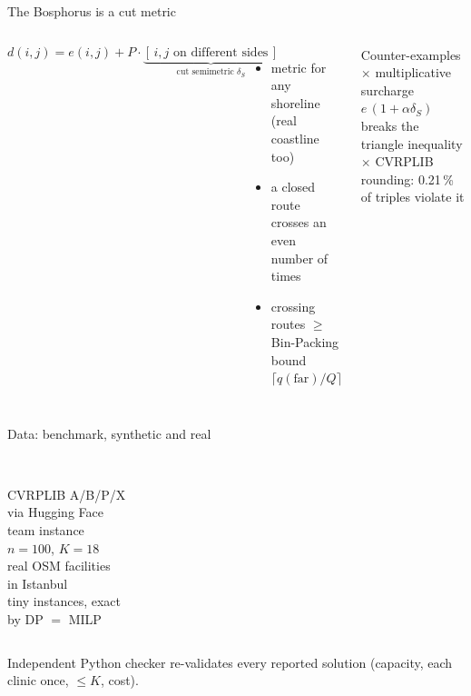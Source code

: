 \documentclass[aspectratio=169,10pt]{beamer}
\newcommand{\bignum}[1]{{\Large\bfseries #1}}
\newcommand{\soft}[1]{{\small\color{ink2}#1}}
\begin{document}
\begin{frame}{The Bosphorus is a cut metric}
\begin{columns}[c,onlytextwidth]
\[
d(i,j)=e(i,j)+P\cdot\underbrace{[\,i,j\text{ on different sides}\,]}_{\text{cut semimetric }\delta_S}
\]
\vspace{2mm}
\begin{itemize}
\item metric for \alert{any} shoreline (real coastline too)
\item a closed route crosses an \alert{even} number of times
\item crossing routes $\ge$ Bin-Packing bound $\lceil q(\text{far})/Q\rceil$
\end{itemize}
\begin{block}{Counter-examples}
\small
$\times$ multiplicative surcharge $e\,(1+\alpha\delta_S)$ breaks the triangle inequality\\[2pt]
$\times$ CVRPLIB rounding: 0.21\,\% of triples violate it
\end{block}
\end{columns}
\end{frame}

\begin{frame}{Data: benchmark, synthetic and real}
\begin{columns}[T,onlytextwidth]
\centering \bignum{74+11}\\ \soft{CVRPLIB A/B/P/X\\ via Hugging Face}
\centering \bignum{seed 7273}\\ \soft{team instance\\ $n=100$, $K=18$}
\centering \bignum{905}\\ \soft{real OSM facilities\\ in Istanbul}
\centering \bignum{9}\\ \soft{tiny instances, exact\\ by DP $=$ MILP}
\end{columns}
\vspace{8mm}
\begin{center}
\soft{Independent Python checker re-validates every reported solution (capacity, each clinic once, $\le K$, cost).}
\end{center}
\end{frame}
\end{document}

